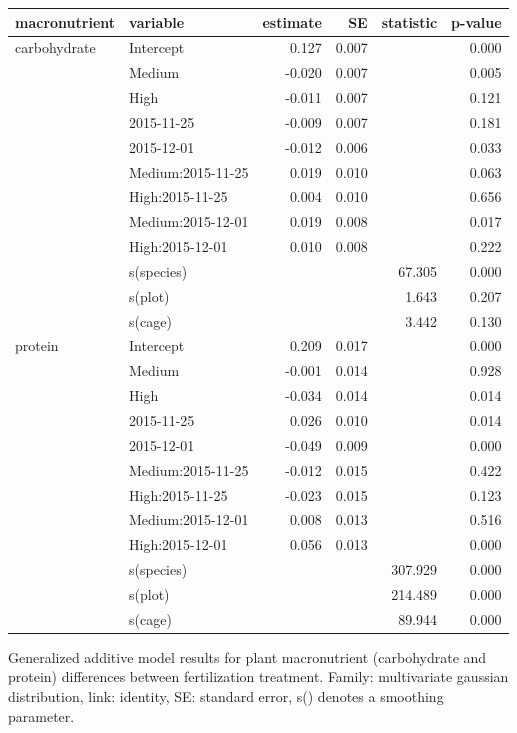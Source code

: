 \documentclass[
]{article}
\begin{document}
\begin{tbl}

\begin{minipage}{\linewidth}

\begingroup
\fontsize{12.0pt}{14.4pt}\selectfont
\begin{longtable*}{llrrrr}
\toprule
macronutrient & variable & estimate & SE & statistic & p-value \\ 
\midrule\addlinespace[2.5pt]
carbohydrate & Intercept & 0.127 & 0.007 &  & 0.000 \\ 
 & Medium & -0.020 & 0.007 &  & 0.005 \\ 
 & High & -0.011 & 0.007 &  & 0.121 \\ 
 & 2015-11-25 & -0.009 & 0.007 &  & 0.181 \\ 
 & 2015-12-01 & -0.012 & 0.006 &  & 0.033 \\ 
 & Medium:2015-11-25 & 0.019 & 0.010 &  & 0.063 \\ 
 & High:2015-11-25 & 0.004 & 0.010 &  & 0.656 \\ 
 & Medium:2015-12-01 & 0.019 & 0.008 &  & 0.017 \\ 
 & High:2015-12-01 & 0.010 & 0.008 &  & 0.222 \\ 
 & s(species) &  &  & 67.305 & 0.000 \\ 
 & s(plot) &  &  & 1.643 & 0.207 \\ 
 & s(cage) &  &  & 3.442 & 0.130 \\ 
protein & Intercept & 0.209 & 0.017 &  & 0.000 \\ 
 & Medium & -0.001 & 0.014 &  & 0.928 \\ 
 & High & -0.034 & 0.014 &  & 0.014 \\ 
 & 2015-11-25 & 0.026 & 0.010 &  & 0.014 \\ 
 & 2015-12-01 & -0.049 & 0.009 &  & 0.000 \\ 
 & Medium:2015-11-25 & -0.012 & 0.015 &  & 0.422 \\ 
 & High:2015-11-25 & -0.023 & 0.015 &  & 0.123 \\ 
 & Medium:2015-12-01 & 0.008 & 0.013 &  & 0.516 \\ 
 & High:2015-12-01 & 0.056 & 0.013 &  & 0.000 \\ 
 & s(species) &  &  & 307.929 & 0.000 \\ 
 & s(plot) &  &  & 214.489 & 0.000 \\ 
 & s(cage) &  &  & 89.944 & 0.000 \\ 
\bottomrule
\end{longtable*}
\endgroup

\end{minipage}%

\caption{\label{tbl-field-cage-plant-nutrients}Generalized additive
model results for plant macronutrient (carbohydrate and protein)
differences between fertilization treatment. Family: multivariate
gaussian distribution, link: identity, SE: standard error, s() denotes a
smoothing parameter.}

\end{tbl}%
\end{document}
